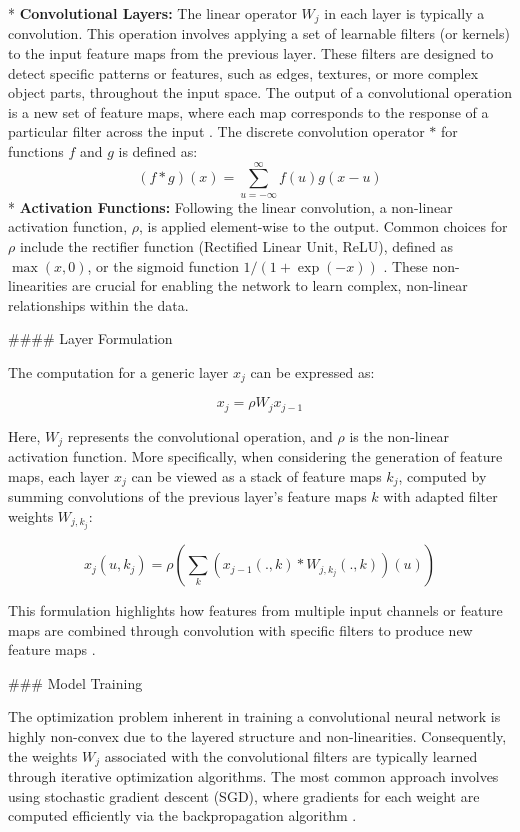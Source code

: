\documentclass{article}
\begin{document}
*   \textbf{Convolutional Layers:} The linear operator $W_j$ in each layer is typically a convolution. This operation involves applying a set of learnable filters (or kernels) to the input feature maps from the previous layer. These filters are designed to detect specific patterns or features, such as edges, textures, or more complex object parts, throughout the input space. The output of a convolutional operation is a new set of feature maps, where each map corresponds to the response of a particular filter across the input \cite{6}. The discrete convolution operator $\ast$ for functions $f$ and $g$ is defined as:
$$ (f \ast g)(x) = \sum_{u=-\infty}^{\infty} f(u)g(x - u) $$
*   \textbf{Activation Functions:} Following the linear convolution, a non-linear activation function, $\rho$, is applied element-wise to the output. Common choices for $\rho$ include the rectifier function (Rectified Linear Unit, ReLU), defined as $\max(x, 0)$, or the sigmoid function $1/(1+\exp(-x))$ \cite{6}. These non-linearities are crucial for enabling the network to learn complex, non-linear relationships within the data.

\#\#\#\# Layer Formulation

The computation for a generic layer $x_j$ can be expressed as:

$$ x_j = \rho W_j x_{j-1} $$

Here, $W_j$ represents the convolutional operation, and $\rho$ is the non-linear activation function. More specifically, when considering the generation of feature maps, each layer $x_j$ can be viewed as a stack of feature maps $k_j$, computed by summing convolutions of the previous layer's feature maps $k$ with adapted filter weights $W_{j,k_j}$:

$$ x_j(u, k_j) = \rho\left(\sum_k (x_{j-1}(., k) \ast W_{j,k_j}(., k))(u)\right) $$

This formulation highlights how features from multiple input channels or feature maps are combined through convolution with specific filters to produce new feature maps \cite{6}.

\#\#\# Model Training

The optimization problem inherent in training a convolutional neural network is highly non-convex due to the layered structure and non-linearities. Consequently, the weights $W_j$ associated with the convolutional filters are typically learned through iterative optimization algorithms. The most common approach involves using stochastic gradient descent (SGD), where gradients for each weight are computed efficiently via the backpropagation algorithm \cite{6}.
\end{document}
